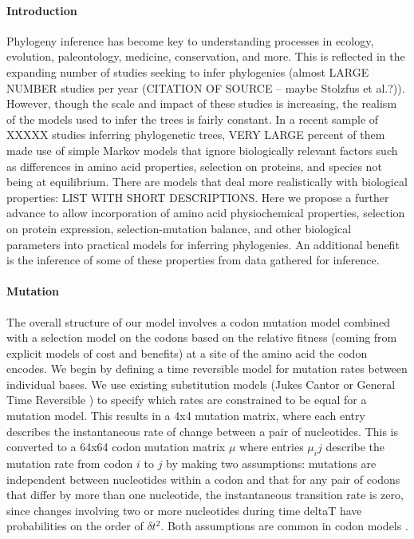 \documentclass{article}
\begin{document}
\paragraph*{Introduction}
Phylogeny inference has become key to understanding processes in ecology, evolution, paleontology, medicine, conservation, and more.
This is reflected in the expanding number of studies seeking to infer phylogenies (almost LARGE NUMBER studies per year (CITATION OF SOURCE -- maybe Stolzfus et al.?)).
However, though the scale and impact of these studies is increasing, the realism of the models used to infer the trees is fairly constant.
In a recent sample of XXXXX studies inferring phylogenetic trees, VERY LARGE percent of them made use of simple Markov models that ignore biologically relevant factors such as differences in amino acid properties, selection on proteins, and species not being at equilibrium. %
There are models that deal more realistically with biological properties: LIST WITH SHORT DESCRIPTIONS.
Here we propose a further advance to allow incorporation of amino acid physiochemical properties, selection on protein expression, selection-mutation balance, and other biological parameters into practical models for inferring phylogenies.
An additional benefit is the inference of some of these properties from data gathered for inference.


\paragraph*{Mutation}
The overall structure of our model involves a codon mutation model combined with a selection model on the codons based on the relative fitness (coming from explicit models of cost and benefits) at a site of the amino acid the codon encodes.
We begin by defining a time reversible model for mutation rates between individual bases.
We use existing substitution models (Jukes Cantor \cite{JukesCantor1969} or General Time Reversible \cite{GTR}) to specify which rates are constrained to be equal for a mutation model.
This results in a 4x4 mutation matrix, where each entry describes the instantaneous rate of change between a pair of nucleotides.
This is converted to a 64x64 codon mutation matrix $\mu$ where entries $\mu_ij$ describe the mutation rate from codon $i$ to $j$ by making two assumptions: mutations are independent between nucleotides within a codon and that for any pair of codons that differ by more than one nucleotide, the instantaneous transition rate is zero, since changes involving two or more nucleotides during time deltaT have probabilities on the order of $\delta t^2$.
Both assumptions are common in codon models \cite{people}.
\end{document}
